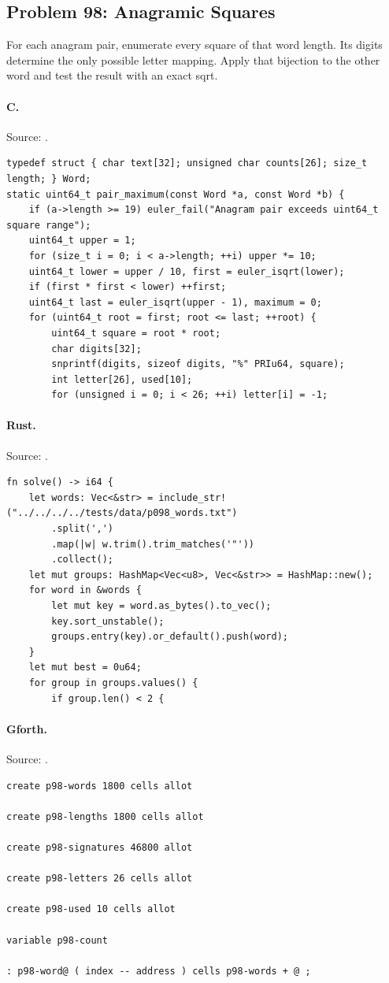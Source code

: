 \subsection{Problem 98: Anagramic Squares}
\label{walkthrough:p98}
For each anagram pair, enumerate every square of that word length. Its digits determine the only possible letter mapping. Apply that bijection to the other word and test the result with an exact sqrt.

\paragraph{C.} Source: .
\begin{lstlisting}
typedef struct { char text[32]; unsigned char counts[26]; size_t length; } Word;
static uint64_t pair_maximum(const Word *a, const Word *b) {
    if (a->length >= 19) euler_fail("Anagram pair exceeds uint64_t square range");
    uint64_t upper = 1;
    for (size_t i = 0; i < a->length; ++i) upper *= 10;
    uint64_t lower = upper / 10, first = euler_isqrt(lower);
    if (first * first < lower) ++first;
    uint64_t last = euler_isqrt(upper - 1), maximum = 0;
    for (uint64_t root = first; root <= last; ++root) {
        uint64_t square = root * root;
        char digits[32];
        snprintf(digits, sizeof digits, "%" PRIu64, square);
        int letter[26], used[10];
        for (unsigned i = 0; i < 26; ++i) letter[i] = -1;
\end{lstlisting}

\paragraph{Rust.} Source: .
\begin{lstlisting}
fn solve() -> i64 {
    let words: Vec<&str> = include_str!("../../../../tests/data/p098_words.txt")
        .split(',')
        .map(|w| w.trim().trim_matches('"'))
        .collect();
    let mut groups: HashMap<Vec<u8>, Vec<&str>> = HashMap::new();
    for word in &words {
        let mut key = word.as_bytes().to_vec();
        key.sort_unstable();
        groups.entry(key).or_default().push(word);
    }
    let mut best = 0u64;
    for group in groups.values() {
        if group.len() < 2 {
\end{lstlisting}

\paragraph{Gforth.} Source: .
\begin{lstlisting}
create p98-words 1800 cells allot

create p98-lengths 1800 cells allot

create p98-signatures 46800 allot

create p98-letters 26 cells allot

create p98-used 10 cells allot

variable p98-count

: p98-word@ ( index -- address ) cells p98-words + @ ;
\end{lstlisting}

